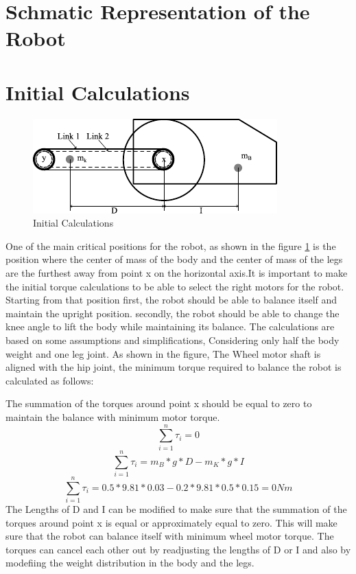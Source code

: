 \section{Schmatic Representation of the Robot}

\section{Initial Calculations}
\begin{figure}[h]
	\centering
	\includegraphics[width=0.7\linewidth]{Initial Calculations}
	\caption[Initial Calculations]{Initial Calculations}
	\label{fig:initialcalculations}
\end{figure}
One of the main critical positions for the robot, as shown in the figure \ref{fig:initialcalculations} is the position where the center of mass of the body and the center of mass of the legs are the furthest away from point x on the horizontal axis.It is important to make the initial torque calculations to be able to select the right motors for the robot.
Starting from that position first, the robot should be able to balance itself and maintain the upright position.
secondly, the robot should be able to change the knee angle to lift the body while maintaining its balance.
The calculations are based on some assumptions and simplifications, Considering only half the body weight and one leg joint.
As shown in the figure, The Wheel motor shaft is aligned with the hip joint, the minimum torque required to balance the robot is calculated as follows:

The summation of the torques around point x should be equal to zero to maintain the balance with minimum motor torque.
\begin{equation}
	\sum_{i=1}^{n} \tau_{i}=0
\end{equation}
\begin{equation}
	\sum_{i=1}^{n} \tau_{i}=m_{B}*g*D-m_{K}*g*I
\end{equation}
\begin{equation}
	\sum_{i=1}^{n} \tau_{i}=0.5*9.81*0.03-0.2*9.81*0.5*0.15=0 Nm
\end{equation}
The Lengths of D and I can be modified to make sure that the summation of the torques around point x is equal or approximately equal to zero.
This will make sure that the robot can balance itself with minimum wheel motor torque.
The torques can cancel each other out by readjusting the lengths of D or I and also by modefiing the weight distribution in the body and the legs.

